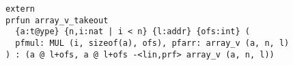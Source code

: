 \documentclass{article}
\begin{document}
\lstset{language=[literate]ATS}
\lstset{columns=fullflexible,captionpos=b,basicstyle=\ttfamily\small}

\begin{lstlisting}
extern
prfun array_v_takeout
  {a:t@ype} {n,i:nat | i < n} {l:addr} {ofs:int} (
  pfmul: MUL (i, sizeof(a), ofs), pfarr: array_v (a, n, l)
) : (a @ l+ofs, a @ l+ofs -<lin,prf> array_v (a, n, l))
\end{lstlisting}
\end{document}
